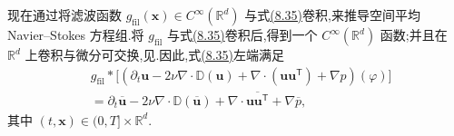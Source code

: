 \begin{note}
\label{note:space-averaged-ns-bounded-domain}
现在通过将滤波函数 $g_{\mathrm{fil}}(\bm{x})\in C^\infty(\mathbb{R}^d)$ 与式\hyperref[eq:distributional-momentum-equation]{(8.35)}卷积,来推导空间平均 Navier--Stokes 方程组.将 $g_{\mathrm{fil}}$ 与式\hyperref[eq:distributional-momentum-equation]{(8.35)}卷积后,得到一个 $C^\infty(\mathbb{R}^d)$ 函数;并且在 $\mathbb{R}^d$ 上卷积与微分可交换,见\textcite[Theorem~4.1.1]{Hormander1990}.因此,式\hyperref[eq:distributional-momentum-equation]{(8.35)}左端满足
\begin{equation}\label{eq:filtered-distributional-momentum-left}
\begin{aligned}
 &g_{\mathrm{fil}}*
  \bigl[
   (\partial_t\bm{u}
    -2\nu\nabla\cdot\mathbb{D}(\bm{u})
    +\nabla\cdot(\bm{u}\bm{u}^{\mathsf T})
    +\nabla p)(\varphi)
  \bigr]\\
 &=\partial_t\overline{\bm{u}}
   -2\nu\nabla\cdot\mathbb{D}(\overline{\bm{u}})
   +\nabla\cdot\overline{\bm{u}\bm{u}^{\mathsf T}}
   +\nabla\overline{p},
\end{aligned}
\end{equation}
其中 $(t,\bm{x})\in(0,T]\times\mathbb{R}^d$.


\end{note}
